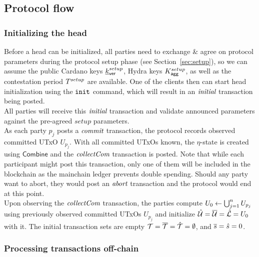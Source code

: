 \subsection{Protocol flow}

\subsubsection{Initializing the head}

\quad Before a head can be initialized, all
parties need to exchange \& agree on protocol parameters during the protocol
setup phase (see Section~\ref{sec:setup}), so we can assume the public Cardano
keys $\underline{k}_{\mathsf{ver}}^{setup}$, Hydra keys $K_{\mathsf{agg}}^{setup}$, as well as the contestation
period $T^{setup}$ are available. One of the clients then can start head initialization using the $\mathtt{init}$ command, which will result in an $\textit{initial}$ transaction being posted.\\

\quad All parties will receive this $\textit{initial}$ transaction and validate announced parameters against the pre-agreed $setup$ parameters.\\

\quad As each party $p_{j}$ posts a
$\textit{commit}$ transaction, the protocol records observed committed UTxO
$U_{p_{j}}$. With all committed UTxOs known, the $\eta$-state is created using
$\mathsf{Combine}$ and the $\textit{collectCom}$ transaction is posted. Note that while
each participant might post this transaction, only one of them will be included
in the blockchain as the mainchain ledger prevents double spending. Should any
party want to abort, they would post an $\textit{abort}$ transaction and the protocol
would end at this point.\\

\quad Upon observing the $\textit{collectCom}$
transaction, the parties compute $U_{0} \gets \bigcup_{j=1}^{n} U_{p_j}$ using
previously observed committed UTxOs $U_{p_j}$ and initialize
$\hat {\mathcal U} = \overline {\mathcal U} = \hat {\mathcal L} = U_{0}$ with it. The initial transaction sets are empty
${\mathcal T} = \overline {\mathcal T} =\hat {\mathcal T} =\emptyset$, and $\overline s = \hat s = 0$.

\subsubsection{Processing transactions off-chain}

